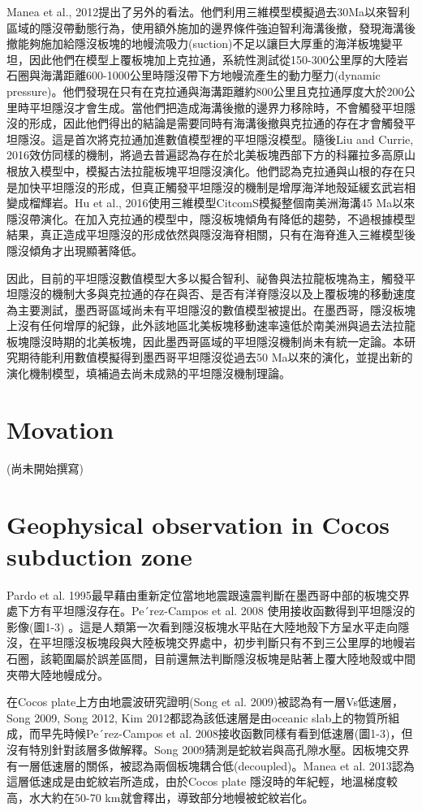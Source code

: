Manea et al., 2012提出了另外的看法。他們利用三維模型模擬過去30Ma以來智利區域的隱沒帶動態行為，使用額外施加的邊界條件強迫智利海溝後撤，發現海溝後撤能夠施加給隱沒板塊的地幔流吸力(suction)不足以讓巨大厚重的海洋板塊變平坦，因此他們在模型上覆板塊加上克拉通，系統性測試從150-300公里厚的大陸岩石圈與海溝距離600-1000公里時隱沒帶下方地幔流產生的動力壓力(dynamic pressure)。他們發現在只有在克拉通與海溝距離約800公里且克拉通厚度大於200公里時平坦隱沒才會生成。當他們把造成海溝後撤的邊界力移除時，不會觸發平坦隱沒的形成，因此他們得出的結論是需要同時有海溝後撤與克拉通的存在才會觸發平坦隱沒。這是首次將克拉通加進數值模型裡的平坦隱沒模型。隨後Liu and Currie, 2016效仿同樣的機制，將過去普遍認為存在於北美板塊西部下方的科羅拉多高原山根放入模型中，模擬古法拉龍板塊平坦隱沒演化。他們認為克拉通與山根的存在只是加快平坦隱沒的形成，但真正觸發平坦隱沒的機制是增厚海洋地殼延緩玄武岩相變成榴輝岩。Hu et al., 2016使用三維模型CitcomS模擬整個南美洲海溝45 Ma以來隱沒帶演化。在加入克拉通的模型中，隱沒板塊傾角有降低的趨勢，不過根據模型結果，真正造成平坦隱沒的形成依然與隱沒海脊相關，只有在海脊進入三維模型後隱沒傾角才出現顯著降低。

因此，目前的平坦隱沒數值模型大多以擬合智利、祕魯與法拉龍板塊為主，觸發平坦隱沒的機制大多與克拉通的存在與否、是否有洋脊隱沒以及上覆板塊的移動速度為主要測試，墨西哥區域尚未有平坦隱沒的數值模型被提出。在墨西哥，隱沒板塊上沒有任何增厚的紀錄，此外該地區北美板塊移動速率遠低於南美洲與過去法拉龍板塊隱沒時期的北美板塊，因此墨西哥區域的平坦隱沒機制尚未有統一定論。本研究期待能利用數值模擬得到墨西哥平坦隱沒從過去50 Ma以來的演化，並提出新的演化機制模型，填補過去尚未成熟的平坦隱沒機制理論。

\section{Movation}

(尚未開始撰寫)

\section{Geophysical observation in Cocos subduction zone}
Pardo et al. 1995最早藉由重新定位當地地震跟遠震判斷在墨西哥中部的板塊交界處下方有平坦隱沒存在。Pe´rez-Campos et al. 2008 使用接收函數得到平坦隱沒的影像(圖1-3) 。這是人類第一次看到隱沒板塊水平貼在大陸地殼下方呈水平走向隱沒，在平坦隱沒板塊段與大陸板塊交界處中，初步判斷只有不到三公里厚的地幔岩石圈，該範圍屬於誤差區間，目前還無法判斷隱沒板塊是貼著上覆大陸地殼或中間夾帶大陸地幔成分。

在Cocos plate上方由地震波研究證明(Song et al. 2009)被認為有一層Vs低速層，Song 2009, Song 2012, Kim 2012都認為該低速層是由oceanic slab上的物質所組成，而早先時候Pe´rez-Campos et al. 2008接收函數同樣有看到低速層(圖1-3)，但沒有特別針對該層多做解釋。Song 2009猜測是蛇紋岩與高孔隙水壓。因板塊交界有一層低速層的關係，被認為兩個板塊耦合低(decoupled)。Manea et al. 2013認為這層低速成是由蛇紋岩所造成，由於Cocos plate 隱沒時的年紀輕，地溫梯度較高，水大約在50-70 km就會釋出，導致部分地幔被蛇紋岩化。

